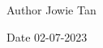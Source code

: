 \begin{DoxyAuthor}{Author}
Jowie Tan 
\end{DoxyAuthor}
\begin{DoxyDate}{Date}
02-\/07-\/2023 
\end{DoxyDate}
